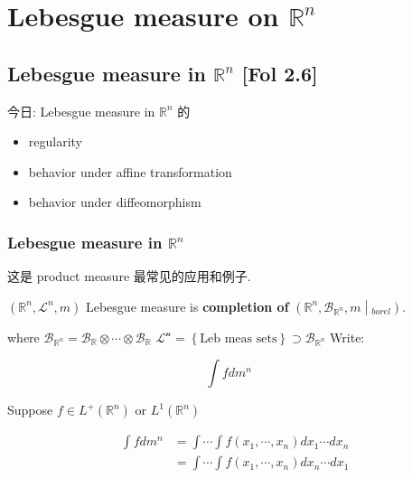 \chapter{\texorpdfstring{Lebesgue measure on \(\mathbb{R}^{n}\)}{Lebesgue measure on \textbackslash mathbb\{R\}\^{}\{n\}}}\label{lebesgue-measure-on-mathbbrn}

\section{\texorpdfstring{Lebesgue measure in \(\mathbb{R}^{n}\) {[}Fol 2.6{]}}{Lebesgue measure in \textbackslash mathbb\{R\}\^{}\{n\} {[}Fol 2.6{]}}}

今日: Lebesgue measure in \(\mathbb{R}^{n}\) 的

\begin{itemize}
\item
  regularity
\item
  behavior under affine transformation
\item
  behavior under diffeomorphism
\end{itemize}

\subsection{\texorpdfstring{Lebesgue measure in \(\mathbb{R}^{n}\)}{Lebesgue measure in \textbackslash mathbb\{R\}\^{}\{n\}}}\label{lebesgue-measure-in-mathbbrn}

这是 product measure 最常见的应用和例子.

\begin{definition}

\((\mathbb{R}^{n},\mathcal{L}^{n},m)\) Lebesgue measure is \textbf{completion of} \(\left. (\mathbb{R}^{n},\mathcal{B}_{\mathbb{R}^{n}},m \middle| {}_{borel}) \right.\).

\end{definition}

where \(\mathcal{B}_{\mathbb{R}^{n}} = \mathcal{B}_{\mathbb{R}} \otimes \cdots \otimes \mathcal{B}_{\mathbb{R}}\) \(\mathcal{L}^{\mathcal{n}} = \left\{ \text{Leb meas sets} \right\} \supset \mathcal{B}_{\mathbb{R}^{n}}\) Write:

\[\int f dm^{n}\quad\]

\begin{theorem}{}

Suppose \(f \in L^{+}(\mathbb{R}^{n})\) or \(L^{1}(\mathbb{R}^{n})\)

\[\begin{matrix}
{\int f dm^{n}} & {= \int\cdots\int f(x_{1},\cdots,x_{n}) dx_{1}\cdots dx_{n}} \\
 & {= \int\cdots\int f(x_{1},\cdots,x_{n}) dx_{n}\cdots dx_{1}}
\end{matrix}\]

\end{theorem}

